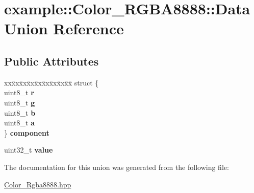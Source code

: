 \hypertarget{unionexample_1_1_color___r_g_b_a8888_1_1_data}{}\section{example\+::Color\+\_\+\+R\+G\+B\+A8888\+::Data Union Reference}
\label{unionexample_1_1_color___r_g_b_a8888_1_1_data}
\subsection*{Public Attributes}
\begin{DoxyCompactItemize}
\item 
\mbox{\label{unionexample_1_1_color___r_g_b_a8888_1_1_data_ad9133dae4f2f59d43bd820c6a8f9b91f}} 
\begin{tabbing}
xx\=xx\=xx\=xx\=xx\=xx\=xx\=xx\=xx\=\kill
struct \{\\
\>uint8\_t {\bfseries r}\\
\>uint8\_t {\bfseries g}\\
\>uint8\_t {\bfseries b}\\
\>uint8\_t {\bfseries a}\\
\} {\bfseries component}\\

\end{tabbing}\item 
\mbox{\label{unionexample_1_1_color___r_g_b_a8888_1_1_data_a956a2fd835f6e53a883adf7bbad04e04}} 
uint32\+\_\+t {\bfseries value}
\end{DoxyCompactItemize}


The documentation for this union was generated from the following file\+:\begin{DoxyCompactItemize}
\item 
\mbox{\hyperlink{_color___rgba8888_8hpp}{Color\+\_\+\+Rgba8888.\+hpp}}\end{DoxyCompactItemize}
